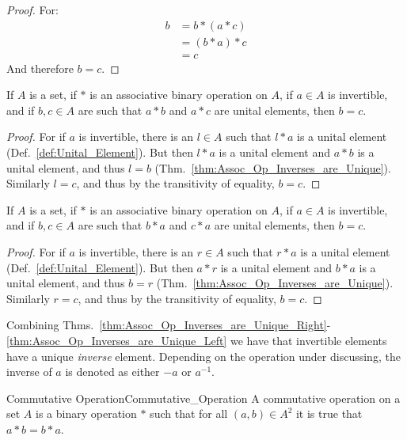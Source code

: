     \begin{proof}
        For:
        \begin{align}
            b&=b*(a*c)
            \tag{$a*b$ is a unital element}\\
            &=(b*a)*c
            \tag{Associativity}\\
            &=c
            \tag{$b*a$ is a unital element}
        \end{align}
        And therefore $b=c$.
    \end{proof}
    \begin{theorem}
        \label{thm:Assoc_Op_Inverses_are_Unique_Right}%
        If $A$ is a set, if $*$ is an associative binary operation on $A$, if
        $a\in{A}$ is invertible, and if $b,c\in{A}$ are such that $a*b$ and
        $a*c$ are unital elements, then $b=c$.
    \end{theorem}
    \begin{proof}
        For if $a$ is invertible, there is an $l\in{A}$ such that $l*a$ is a
        unital element (Def.~\ref{def:Unital_Element}). But then $l*a$ is a
        unital element and $a*b$ is a unital element, and thus $l=b$
        (Thm.~\ref{thm:Assoc_Op_Inverses_are_Unique}). Similarly $l=c$, and thus
        by the transitivity of equality, $b=c$.
    \end{proof}
    \begin{theorem}
        \label{thm:Assoc_Op_Inverses_are_Unique_Left}%
        If $A$ is a set, if $*$ is an associative binary operation on $A$, if
        $a\in{A}$ is invertible, and if $b,c\in{A}$ are such that $b*a$ and
        $c*a$ are unital elements, then $b=c$.
    \end{theorem}
    \begin{proof}
        For if $a$ is invertible, there is an $r\in{A}$ such that $r*a$ is a
        unital element (Def.~\ref{def:Unital_Element}). But then $a*r$ is a
        unital element and $b*a$ is a unital element, and thus $b=r$
        (Thm.~\ref{thm:Assoc_Op_Inverses_are_Unique}). Similarly $r=c$, and thus
        by the transitivity of equality, $b=c$.
    \end{proof}
    Combining Thms.~\ref{thm:Assoc_Op_Inverses_are_Unique_Right}-%
    \ref{thm:Assoc_Op_Inverses_are_Unique_Left} we have that invertible elements
    have a unique \textit{inverse} element. Depending on the operation under
    discussing, the inverse of $a$ is denoted as either $\minus{a}$ or
    $a^{\minus{1}}$.
    \begin{fdefinition}{Commutative Operation}{Commutative_Operation}
        A \gls{commutative operation} on a \gls{set} $A$ is a
        \gls{binary operation} $*$ such that for all $(a,b)\in{A}^{2}$ it is
        true that $a*b=b*a$.
    \end{fdefinition}
